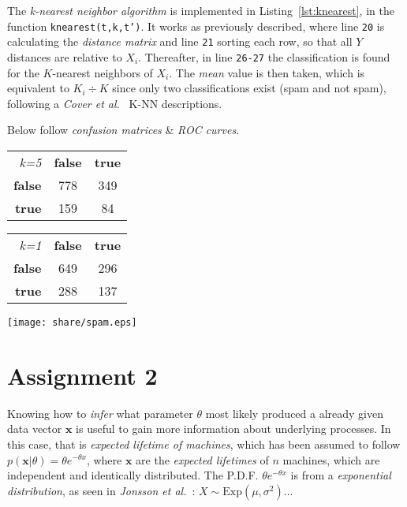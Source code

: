 \documentclass[a4paper, twocolumn]{article}
\begin{document}
    The \emph{k-nearest neighbor algorithm} is implemented in Listing~\ref{lst:knearest}, in the function \texttt{knearest(t,k,t')}. It works as previously described, where line \texttt{20} is calculating the \emph{distance matrix} and line \texttt{21} sorting each row, so that all $Y$ distances are relative to $X_i$. Thereafter, in line \texttt{26-27} the classification is found for the $K$-nearest neighbors of $X_i$. The \emph{mean} value is then taken, which is equivalent to $K_i \div K$ since only two classifications exist (spam and not spam), following a \emph{Cover et al.}~\cite{cover1967nearest} K-NN descriptions.

    Below follow \emph{confusion matrices} \& \emph{ROC curves}.

    \begin{table}[h]
    \begin{center}
    \begin{tabular}{r|c|c|}
        \multicolumn{1}{r}{\emph{k=5}}
        &\multicolumn{1}{c}{\textbf{false}}
        &\multicolumn{1}{c}{\textbf{true}} \\
        \cline{2-3}
        \textbf{false} & 778 & 349 \\
        \cline{2-3}
        \textbf{true} & 159 & 84 \\
        \cline{2-3}
    \end{tabular}
    \begin{tabular}{r|c|c|}
        \multicolumn{1}{r}{\emph{k=1}}
        &\multicolumn{1}{c}{\textbf{false}}
        &\multicolumn{1}{c}{\textbf{true}} \\
        \cline{2-3}
        \textbf{false} & 649 & 296 \\
        \cline{2-3}
        \textbf{true} & 288 & 137 \\
        \cline{2-3}
    \end{tabular}
    \end{center}
    \end{table}

    \texttt{[image: share/spam.eps]}

    \section*{Assignment 2}

    Knowing how to \emph{infer} what parameter $\theta$ most likely produced a already given data vector $\bm{x}$ is useful to gain more information about underlying processes. In this case, that is \emph{expected lifetime of machines}, which has been assumed to follow $p(\bm{x} | \theta) = \theta e^{-\theta x}$, where $\bm{x}$ are the \emph{expected lifetimes} of $n$ machines, which are independent and identically distributed. The P.D.F. $\theta e^{-\theta x}$ is from a \emph{exponential distribution}, as seen in \emph{Jonsson et al.}~\cite{jonsson1999ett}: $X \sim \mathrm{Exp}(\mu, \sigma^2)$...
\end{document}
